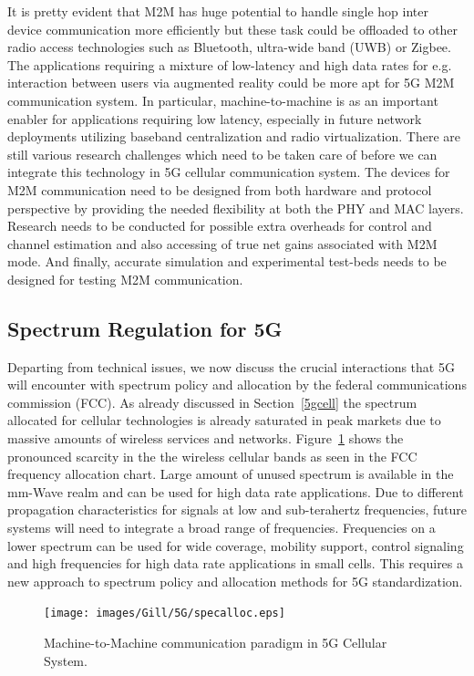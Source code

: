 It is pretty evident that M2M has huge potential to handle single hop inter device communication more efficiently but these task could be offloaded to other radio access technologies such as Bluetooth, ultra-wide band (UWB) or Zigbee. The applications requiring a mixture of low-latency and high data rates for e.g. interaction between users via augmented reality could be more apt for 5G M2M communication system. In particular, machine-to-machine is as an important enabler for applications requiring low latency, especially in future network deployments utilizing baseband centralization and radio virtualization. There are still various research challenges which need to be taken care of before we can integrate this technology in 5G cellular communication system. The devices for M2M communication need to be designed from both hardware and protocol perspective by providing the needed flexibility at both the PHY and MAC layers. Research needs to be conducted for possible extra overheads for control and channel estimation and also accessing of true net gains associated with M2M mode. And finally, accurate simulation and experimental test-beds needs to be designed for testing M2M communication.

\subsection{Spectrum Regulation for 5G}

Departing from technical issues, we now discuss the crucial interactions that 5G will encounter with spectrum policy and allocation by the federal communications commission (FCC). As already discussed in Section~\ref{5gcell} the spectrum allocated for cellular technologies is already saturated in peak markets due to massive amounts of wireless services and networks. Figure~\ref{specalloc} shows the pronounced scarcity in the the wireless cellular bands as seen in the FCC frequency allocation chart. Large amount of unused spectrum is available in the mm-Wave realm and can be used for high data rate applications. Due to different propagation characteristics for signals at low and sub-terahertz frequencies, future systems will need to integrate a broad range of frequencies. Frequencies on a lower spectrum can be used for wide coverage, mobility support, control signaling and high frequencies for high data rate applications in small cells. This requires a new approach to spectrum policy and allocation methods for 5G standardization.

\begin{figure}[!ht]
	\centering
\texttt{[image: images/Gill/5G/specalloc.eps]}
	\caption{Machine-to-Machine communication paradigm in 5G Cellular System.}
	\label{specalloc}
\end{figure}

